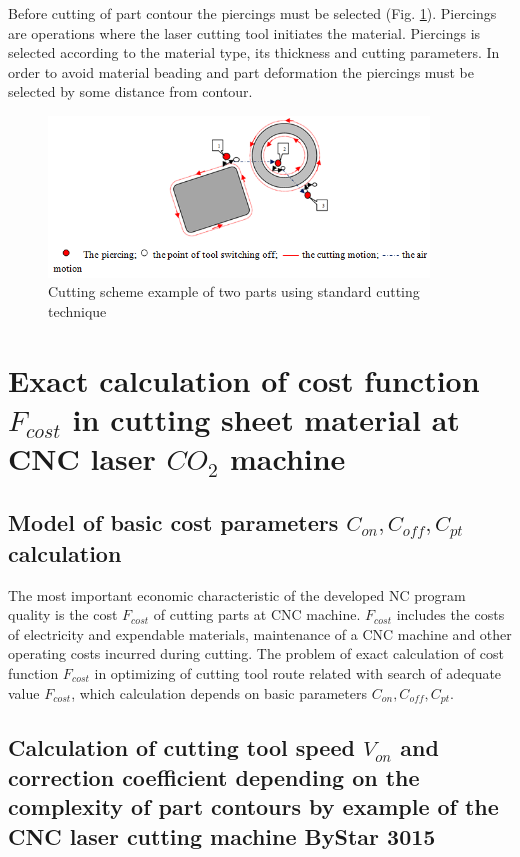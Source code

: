 \documentclass[runningheads]{llncs}
\begin{document}
Before cutting of part contour the piercings must be selected (Fig. \ref{elements}).
Piercings are operations where the laser cutting tool initiates the material.
Piercings is selected according to the material type, its thickness and cutting parameters.
In order to avoid material beading and part deformation the piercings must be selected by some distance from contour.

\begin{figure}
  \begin{center}
  \includegraphics[width=0.9\textwidth]{elements.png}
  \caption{Cutting scheme example of two parts using standard cutting technique}
  \label{elements}
  \end{center}
\end{figure}

\section{Exact calculation of cost function $F_{cost}$ in cutting sheet material at CNC laser $CO_2$ machine}

\subsection{Model of basic cost parameters  $C_{on}, C_{off}, C_{pt}$ calculation}

The most important economic characteristic of the developed NC program quality is the cost $F_{cost}$
of cutting parts at CNC machine.
$F_{cost}$ includes the costs of electricity and expendable materials,
maintenance of a CNC machine and other operating costs incurred during cutting.
The problem of exact calculation of cost function $F_{cost}$
in optimizing of cutting tool route related with search of adequate value  $F_{cost}$,
which calculation depends on basic parameters  $C_{on}, C_{off}, C_{pt}$.

\subsection{Calculation of cutting tool speed $V_{on}$
and correction coefficient depending on the complexity of
part contours by example of the CNC laser cutting machine ByStar 3015}
\end{document}
